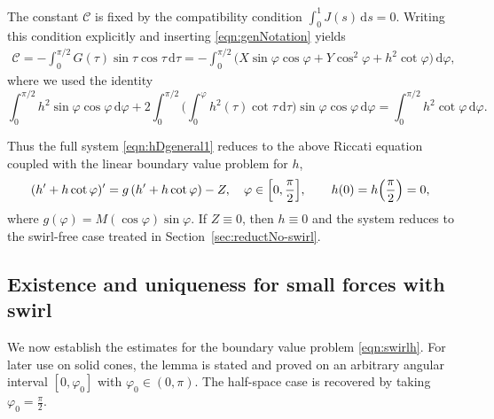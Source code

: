 \documentclass{amsart}
\newcommand{\vp}{\varphi}
\begin{document}
The constant $\mathcal{C}$ is fixed by the compatibility condition $\int_{0}^{1} J(s)\,\mathrm{d}s=0$.
Writing this condition explicitly and inserting \eqref{eqn:genNotation} yields
\begin{align}\label{eqn:swirlconstC}
\mathcal{C}
= -\int_{0}^{\pi/2} G(\tau)\sin\tau\cos\tau\,\mathrm{d}\tau 
= -\int_{0}^{\pi/2}\big( X\sin\varphi\cos\varphi + Y\cos^{2}\varphi
+ h^{2}\cot\vp\big)\,\mathrm{d}\varphi ,
\end{align}
where we used the identity
\[
\int_{0}^{\pi/2} h^{2}\sin\varphi\cos\varphi\,\mathrm{d}\varphi
+ 2\int_{0}^{\pi/2}\!\biggl( \int_{0}^{\varphi} h^{2}(\tau)\cot\tau\,\mathrm{d}\tau \biggr)\sin\varphi\cos\varphi\,\mathrm{d}\varphi
= \int_{0}^{\pi/2} h^{2}\cot\varphi\,\mathrm{d}\varphi.
\]

Thus the full system \eqref{eqn:hDgeneral1} reduces to the above Riccati equation coupled with the linear boundary value problem for $h$,
\begin{equation}\label{eqn:swirlh}
(h' + h\cot\varphi)' = g\,(h' + h\cot\varphi) - Z, \quad \vp \in \Bigl[0,\frac{\pi}{2}\Bigr],
\qquad h(0)=h\Bigl(\frac{\pi}{2}\Bigr)=0,
\end{equation}
where $g(\varphi)=M(\cos\varphi)\sin\varphi$.  If $Z\equiv0$, then $h\equiv0$ and the system reduces to the swirl-free case treated in Section~\ref{sec:reductNo-swirl}.


\subsection{Existence and uniqueness for small forces with swirl}\label{sec:ExistSwirl}


We now establish the estimates for the boundary value problem \eqref{eqn:swirlh}.
For later use on solid cones, the lemma is stated and proved on an arbitrary angular interval $[0,\varphi_0]$ with $\varphi_0\in(0,\pi)$. The half-space case is recovered by taking $\varphi_0=\frac{\pi}{2}$.
\end{document}
